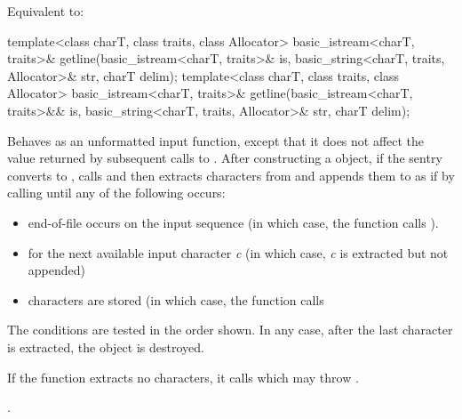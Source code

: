 \begin{itemdescr}
\pnum
\effects
Equivalent to: 
\end{itemdescr}

%
\begin{itemdecl}
template<class charT, class traits, class Allocator>
  basic_istream<charT, traits>&
    getline(basic_istream<charT, traits>& is,
            basic_string<charT, traits, Allocator>& str,
            charT delim);
template<class charT, class traits, class Allocator>
  basic_istream<charT, traits>&
    getline(basic_istream<charT, traits>&& is,
            basic_string<charT, traits, Allocator>& str,
            charT delim);
\end{itemdecl}

\begin{itemdescr}
\pnum
\effects
Behaves as an unformatted input function,
except that it does not affect the value returned by subsequent calls to
.
After constructing a
object, if the sentry converts to , calls
and then extracts characters from  and appends them
to  as if by calling
until any of the following occurs:
\begin{itemize}
\item
end-of-file occurs on the input sequence
(in which case, the
function calls
).
\item
{}
for the next available input character
\textit{c}
(in which case,
\textit{c}
is extracted but not appended)
\item
{}
characters are stored
(in which case,
the function calls
\end{itemize}

\pnum
The conditions are tested in the order shown.
In any case,
after the last character is extracted, the
object is destroyed.

\pnum
If the function extracts no characters, it calls
which may throw
.

\pnum
\returns
{}.
\end{itemdescr}

